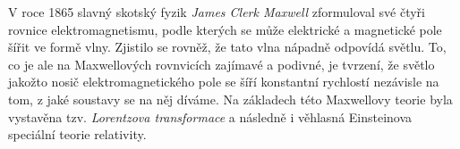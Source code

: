 \documentclass{../../../../style/mkimain}
\begin{document}
\noindent{}
\klein

V roce 1865 slavný skotský fyzik \emph{James Clerk Maxwell} zformuloval své čtyři rovnice elektromagnetismu,
podle kterých se může elektrické a magnetické pole šířit ve formě vlny. %
Zjistilo se rovněž, že tato vlna nápadně odpovídá světlu.
To, co je ale na Maxwellových rovnvicích zajímavé a podivné, je tvrzení,
že světlo jakožto nosič elektromagnetického pole se šíří konstantní rychlostí nezávisle na tom, z jaké soustavy se na něj díváme.
Na základech této Maxwellovy teorie byla vystavěna tzv. \emph{Lorentzova transformace}
a následně i věhlasná Einsteinova speciální teorie relativity.

\end{document}
